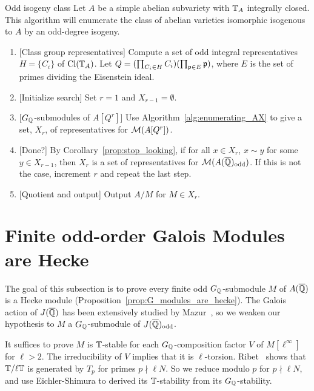 \begin{algorithm}{Odd isogeny class}%
    \label{alg:odd_isogeny_class}
    Let $A$ be a simple abelian subvariety with $\mathbb{T}_A$ integrally closed. This
    algorithm will enumerate the class of abelian varieties isomorphic
    isogenous to $A$ by an odd-degree isogeny.
    \begin{enumerate}
        \item{} [Class group representatives]
            Compute a set of odd integral representatives $H=\{C_i\}$ of
            $\operatorname{Cl}(\mathbb{T}_A)$. Let $Q = (\prod_{C_i\in H} C_i)(\prod_{\mathfrak{p}\in E} \mathfrak{p})$,
            where $E$ is the set of primes dividing the Eisenstein ideal.
        \item{} [Initialize search]
            Set $r=1$ and $X_{r-1}=\emptyset$.
        \item{} [$G_{\mathbb{Q}}$-submodules of $A[Q^r]$]
            Use Algorithm~\ref{alg:enumerating_AX} to give a set, $X_r$, of
            representatives for $\mathcal{M}(A[Q^r])$.
        \item{} [Done?]
            By Corollary~\ref{prop:stop_looking}, if for all $x\in X_r$, $x\sim
            y$ for some $y\in X_{r-1}$, then $X_r$ is a set of representatives
            for $\mathcal{M}(A(\overline{\mathbb{Q}})_{\mathrm{odd}})$. If this is not the case, increment $r$
            and repeat the last step.
        \item{} [Quotient and output]
            Output $A/M$ for $M\in X_r$.
    \end{enumerate}
\end{algorithm}

\section{Finite odd-order Galois Modules are Hecke}%
\label{sec:finite_odd_order_galois_modules_are_hecke}

The goal of this subsection is to prove every finite odd $G_{\mathbb{Q}}$-submodule $M$
of $A(\overline{\mathbb{Q}})$ is a Hecke module (Proposition~\ref{prop:G_modules_are_hecke}). The
Galois action of $J(\overline{\mathbb{Q}})$ has been extensively studied by
Mazur~\cite{mazur:eisenstein}, so we weaken our hypothesis to $M$ a
$G_{\mathbb{Q}}$-submodule of $J(\overline{\mathbb{Q}})_{\mathrm{odd}}$.

It suffices to prove $M$ is $\mathbb{T}$-stable for each $G_{\mathbb{Q}}$-composition factor $V$
of $M[\ell^\infty]$ for $\ell>2$. The irreducibility of $V$ implies that it is
$\ell$-torsion. Ribet~\cite[Proposition 6.1]{ribet:semistable_gal} shows that
$\mathbb{T}/\ell \mathbb{T}$ is generated by $T_p$ for primes $p\nmid \ell N$. So we reduce
modulo $p$ for $p\nmid \ell N$, and use Eichler-Shimura to derived its
$\mathbb{T}$-stability from its $G_{\mathbb{Q}}$-stability.

